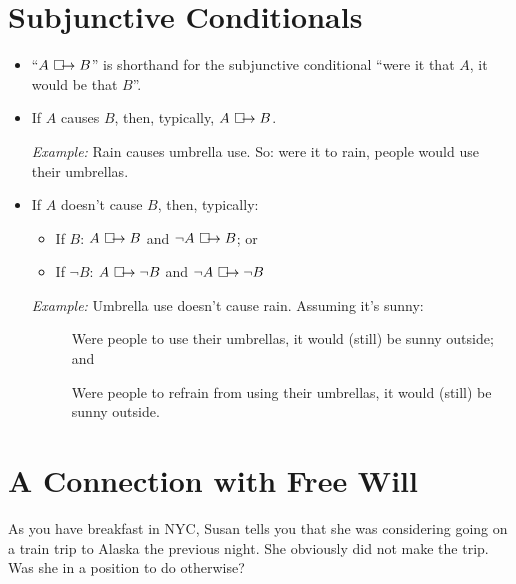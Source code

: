 \documentclass[12pt]{extarticle}
\newcommand{\boxarrow}{\ \Box\hspace{-1.8mm}\rightarrow}
\begin{document}
\section{Subjunctive Conditionals}

\begin{itemize}
\item ``$A \boxarrow B$'' is shorthand for the subjunctive conditional ``were it that $A$, it would be that $B$''.

\item If $A$ causes $B$, then, typically, $A \boxarrow B$. 

\emph{Example:} Rain causes umbrella use. So: were it to rain, people would use their umbrellas.



\item If $A$ doesn't cause $B$, then, typically:

\begin{itemize}

\item If $B$: $A \boxarrow B$ and $\neg A \boxarrow B$; or

\item If $\neg B$: $A \boxarrow \neg B$ and $\neg A \boxarrow \neg B$

\end{itemize}
\emph{Example:} Umbrella use doesn't cause rain. Assuming it's sunny:

\begin{description}
\item[] Were people to use their umbrellas, it would (still) be sunny outside; and
\item[] Were people to refrain from using their umbrellas, it would (still) be sunny outside.
\end{description}


\end{itemize}

\section{A Connection with Free Will}

As you have breakfast in NYC, Susan tells you that she was considering going on a train trip to Alaska the previous night. She obviously did not make the trip. Was she in a position to do otherwise?
\end{document}
